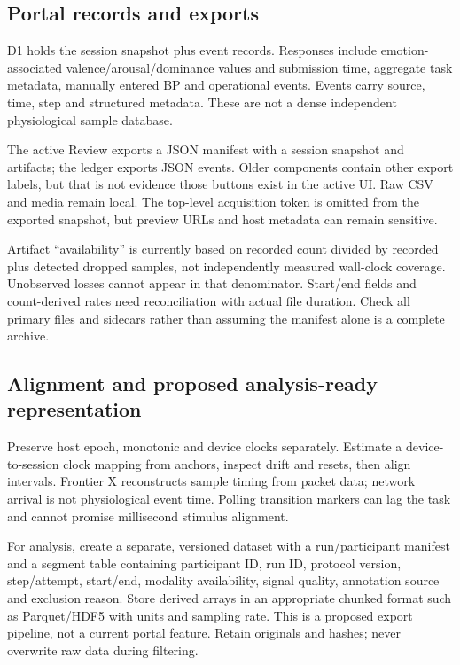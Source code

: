 \documentclass[11pt,a4paper]{article}
\begin{document}
\normalsize

\subsection{Portal records and exports}
D1 holds the session snapshot plus event records. Responses include emotion-associated valence/arousal/dominance values and submission time, aggregate task metadata, manually entered BP and operational events. Events carry source, time, step and structured metadata. These are not a dense independent physiological sample database.

The active Review exports a JSON manifest with a session snapshot and artifacts; the ledger exports JSON events. Older components contain other export labels, but that is not evidence those buttons exist in the active UI. Raw CSV and media remain local. The top-level acquisition token is omitted from the exported snapshot, but preview URLs and host metadata can remain sensitive.

Artifact ``availability'' is currently based on recorded count divided by recorded plus detected dropped samples, not independently measured wall-clock coverage. Unobserved losses cannot appear in that denominator. Start/end fields and count-derived rates need reconciliation with actual file duration. Check all primary files and sidecars rather than assuming the manifest alone is a complete archive.

\subsection{Alignment and proposed analysis-ready representation}
Preserve host epoch, monotonic and device clocks separately. Estimate a device-to-session clock mapping from anchors, inspect drift and resets, then align intervals. Frontier X reconstructs sample timing from packet data; network arrival is not physiological event time. Polling transition markers can lag the task and cannot promise millisecond stimulus alignment.

For analysis, create a separate, versioned dataset with a run/participant manifest and a segment table containing participant ID, run ID, protocol version, step/attempt, start/end, modality availability, signal quality, annotation source and exclusion reason. Store derived arrays in an appropriate chunked format such as Parquet/HDF5 with units and sampling rate. This is a proposed export pipeline, not a current portal feature. Retain originals and hashes; never overwrite raw data during filtering.
\end{document}
